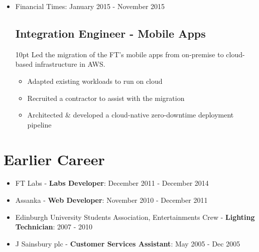 \documentclass[a4paper]{article}
\newenvironment{detail}{\begin{adjustwidth}{10pt}{}}{\end{adjustwidth}}
\begin{document}
\begin{itemize}
\item Financial Times: January 2015 - November 2015
\subsection*{Integration Engineer - Mobile Apps}
\begin{detail}
Led the migration of the FT's mobile apps from on-premise to cloud-based infrastructure in AWS.
\begin{itemize}
	\item Adapted existing workloads to run on cloud
	\item Recruited a contractor to assist with the migration
	\item Architected \& developed a cloud-native zero-downtime deployment pipeline
\end{itemize}
\end{detail}

\end{itemize}

\section*{Earlier Career}
\begin{itemize}

\item FT Labs - {\bf Labs Developer}: December 2011 - December 2014
\item Assanka - {\bf Web Developer}: November 2010 - December 2011
\item Edinburgh University Students Association, Entertainments Crew - {\bf Lighting Technician}: 2007 - 2010
\item J Sainsbury plc - {\bf Customer Services Assistant}: May 2005 - Dec 2005

\end{itemize}

\pagebreak
\end{document}
